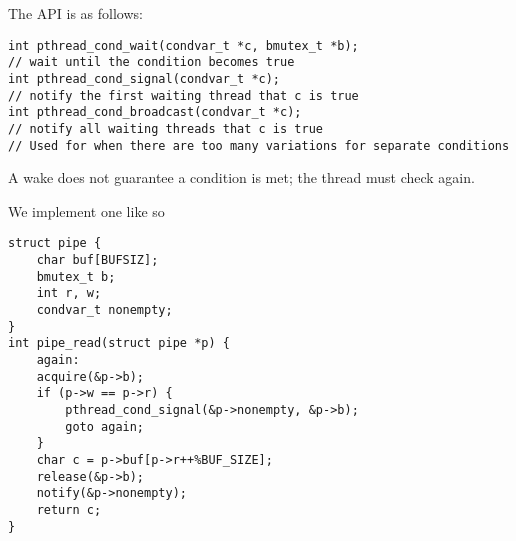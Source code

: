 \documentclass[../../lecture_notes.tex]{subfiles}
\begin{document}
The API is as follows:
\begin{lstlisting}
int pthread_cond_wait(condvar_t *c, bmutex_t *b);
// wait until the condition becomes true
int pthread_cond_signal(condvar_t *c);
// notify the first waiting thread that c is true
int pthread_cond_broadcast(condvar_t *c);
// notify all waiting threads that c is true
// Used for when there are too many variations for separate conditions
\end{lstlisting}

A wake does not guarantee a condition is met; the thread must check again.

We implement one like so
\begin{lstlisting}
struct pipe {
	char buf[BUFSIZ];
	bmutex_t b;
	int r, w;
	condvar_t nonempty;
}
int pipe_read(struct pipe *p) {
	again:
	acquire(&p->b);
	if (p->w == p->r) {
		pthread_cond_signal(&p->nonempty, &p->b);
		goto again;
	}
	char c = p->buf[p->r++%BUF_SIZE];
	release(&p->b);
	notify(&p->nonempty);
	return c;
}
\end{lstlisting}
\end{document}

